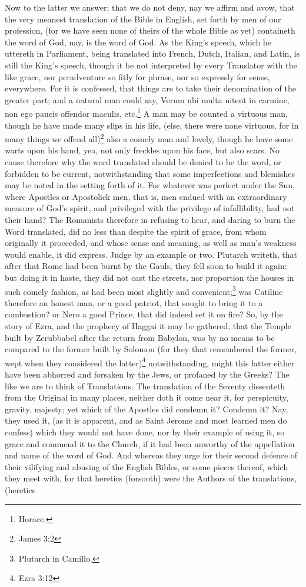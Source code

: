 Now to the latter we answer; that we do not deny, nay we affirm and avow, that the very meanest translation of the Bible in English, set forth by men of our profession, (for we have seen none of theirs of the whole Bible as yet) containeth the word of God, nay, is the word of God. As the King's speech, which he uttereth in Parliament, being translated into French, Dutch, Italian, and Latin, is still the King's speech, though it be not interpreted by every Translator with the like grace, nor peradventure so fitly for phrase, nor so expressly for sense, everywhere. For it is confessed, that things are to take their denomination of the greater part; and a natural man could say, Verum ubi multa nitent in carmine, non ego paucis offendor maculis, etc.\footnote{Horace.} A man may be counted a virtuous man, though he have made many slips in his life, (else, there were none virtuous, for in many things we offend all)\footnote{James 3:2} also a comely man and lovely, though he have some warts upon his hand, yea, not only freckles upon his face, but also scars. No cause therefore why the word translated should be denied to be the word, or forbidden to be current, notwithstanding that some imperfections and blemishes may be noted in the setting forth of it. For whatever was perfect under the Sun, where Apostles or Apostolick men, that is, men endued with an extraordinary measure of God's spirit, and privileged with the privilege of infallibility, had not their hand? The Romanists therefore in refusing to hear, and daring to burn the Word translated, did no less than despite the spirit of grace, from whom originally it proceeded, and whose sense and meaning, as well as man's weakness would enable, it did express. Judge by an example or two. Plutarch writeth, that after that Rome had been burnt by the Gauls, they fell soon to build it again: but doing it in haste, they did not cast the streets, nor proportion the houses in such comely fashion, as had been most slightly and convenient;\footnote{Plutarch in Camillo.} was Catiline therefore an honest man, or a good patriot, that sought to bring it to a combustion? or Nero a good Prince, that did indeed set it on fire? So, by the story of Ezra, and the prophecy of Haggai it may be gathered, that the Temple built by Zerubbabel after the return from Babylon, was by no means to be compared to the former built by Solomon (for they that remembered the former, wept when they considered the latter)\footnote{Ezra 3:12} notwithstanding, might this latter either have been abhorred and forsaken by the Jews, or profaned by the Greeks? The like we are to think of Translations. The translation of the Seventy dissenteth from the Original in many places, neither doth it come near it, for perspicuity, gravity, majesty; yet which of the Apostles did condemn it? Condemn it? Nay, they used it, (as it is apparent, and as Saint Jerome and most learned men do confess) which they would not have done, nor by their example of using it, so grace and commend it to the Church, if it had been unworthy of the appellation and name of the word of God. And whereas they urge for their second defence of their vilifying and abusing of the English Bibles, or some pieces thereof, which they meet with, for that heretics (forsooth) were the Authors of the translations, (heretics 